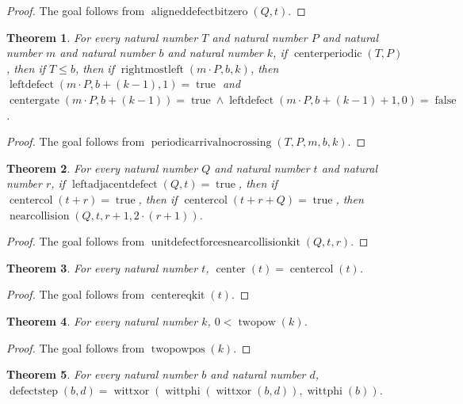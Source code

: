 \documentclass[11pt]{article}
\newtheorem{theorem}{Theorem}[section]
\theoremstyle{definition}
\begin{document}
\begin{proof}
The goal follows from \(\operatorname{aligneddefectbitzero}(Q, t)\).
\end{proof}
\begin{theorem}
\label{ll:observations:periodic-arrival-no-crossing}
For every natural number \(T\) and natural number \(P\) and natural number \(m\) and natural number \(b\) and natural number \(k\), if \(\operatorname{centerperiodic}(T, P)\), then if \(T \le b\), then if \(\operatorname{rightmostleft}(m \cdot P, b, k)\), then \(\operatorname{leftdefect}(m \cdot P, b + (k - 1), 1) = \operatorname{true}\) and \(\operatorname{centergate}(m \cdot P, b + (k - 1)) = \operatorname{true} \land \operatorname{leftdefect}(m \cdot P, b + (k - 1) + 1, 0) = \operatorname{false}\).
\end{theorem}
\begin{proof}
The goal follows from \(\operatorname{periodicarrivalnocrossing}(T, P, m, b, k)\).
\end{proof}
\begin{theorem}
\label{ll:observations:unit-defect-forces-near-collision-kit}
For every natural number \(Q\) and natural number \(t\) and natural number \(r\), if \(\operatorname{leftadjacentdefect}(Q, t) = \operatorname{true}\), then if \(\operatorname{centercol}(t + r) = \operatorname{true}\), then if \(\operatorname{centercol}(t + r + Q) = \operatorname{true}\), then \(\operatorname{nearcollision}(Q, t, r + 1, 2 \cdot (r + 1))\).
\end{theorem}
\begin{proof}
The goal follows from \(\operatorname{unitdefectforcesnearcollisionkit}(Q, t, r)\).
\end{proof}
\begin{theorem}
\label{ll:observations:center-eq-kit}
For every natural number \(t\), \(\operatorname{center}(t) = \operatorname{centercol}(t)\).
\end{theorem}
\begin{proof}
The goal follows from \(\operatorname{centereqkit}(t)\).
\end{proof}
\begin{theorem}
\label{ll:observations:twopow-pos}
For every natural number \(k\), \(0 < \operatorname{twopow}(k)\).
\end{theorem}
\begin{proof}
The goal follows from \(\operatorname{twopowpos}(k)\).
\end{proof}
\begin{theorem}
\label{ll:observations:defect-step-eq}
For every natural number \(b\) and natural number \(d\), \(\operatorname{defectstep}(b, d) = \operatorname{wittxor}(\operatorname{wittphi}(\operatorname{wittxor}(b, d)), \operatorname{wittphi}(b))\).
\end{theorem}
\end{document}
